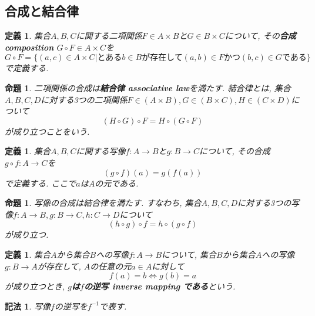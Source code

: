 \documentclass[dvipdfmx]{jsbook}
\theoremstyle{plain}
\newtheorem{Def}[thm]{定義}
\newtheorem{Notation}[thm]{記法}
\newtheorem{Prop}[thm]{命題}
\begin{document}
\subsection{合成と結合律}
\begin{Def}
集合$A,B,C$に関する二項関係$F\in A\times B$と$G\in B\times C$について, その{\bf 合成 composition} $G\circ F\in A\times C$を
\[
G\circ F=\{(a,c)\in A\times C|\text{とある}b\in B\text{が存在して}(a,b)\in F \text{かつ} (b,c)\in G\text{である}\}
\]
で定義する.
\end{Def}
\begin{Prop}
二項関係の合成は{\bf 結合律 associative law}を満たす.
結合律とは, 集合$A,B,C,D$に対する3つの二項関係$F\in(A\times B),G\in(B\times C),H\in(C\times D)$について
\[
(H\circ G)\circ F=H\circ (G\circ F)
\]
が成り立つことをいう.
\end{Prop}

\begin{Def}
集合$A,B,C$に関する写像$f:A\rightarrow B$と$g:B\rightarrow C$について, その合成 $g\circ f:A\rightarrow C$を
\[
(g\circ f)(a)=g(f(a))
\]
で定義する. ここで$a$は$A$の元である.
\end{Def}
\begin{Prop}
写像の合成は結合律を満たす.
すなわち, 集合$A,B,C,D$に対する3つの写像$f:A\rightarrow B, g:B\rightarrow C,
h:C\rightarrow D$について
\[
(h\circ g)\circ f=h\circ(g\circ f)
\]
が成り立つ.
\end{Prop}

\begin{Def}
集合$A$から集合$B$への写像$f:A\rightarrow B$について, 集合$B$から集合$A$への写像$g:B\rightarrow A$が存在して, $A$の任意の元$a\in A$に対して
\[
f(a)=b \Leftrightarrow g(b)=a
\]
が成り立つとき, {\bf $g$は$f$の逆写 inverse mapping である}という.
\end{Def}
\begin{Notation}
写像$f$の逆写を$f^{-1}$で表す.
\end{Notation}

\begin{comment}
************************************
\begin{Def}
部分関数の合成
\end{Def}

\begin{Prop}
部分関数の合成は結合律を満たす.
\end{Prop}
************************************
\end{comment}

\begin{comment}
************************************
\section{族}
\begin{Def}
集合$I$ 
から集合$X$への写像$f:I\rightarrow X$が存在するとき, 集合$\{x_i\in X\mid x_i=f(i), i\in I\}$のことを
{\bf $I$を添字集合 index set とする$X$の元の族}という.
\end{Def}
************************************
\end{comment}
\end{document}
